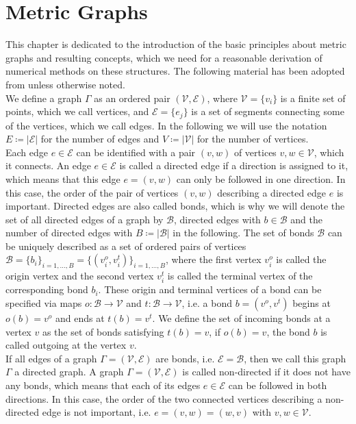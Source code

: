 \section{Metric Graphs}
\label{ch1:sec1}

This chapter is dedicated to the introduction of the basic principles about metric graphs and resulting concepts, which we need for a reasonable derivation of numerical methods on these structures. The following material has been adopted from \cite[chapter~1]{BerkolaikoKuchment:2013} unless otherwise noted. \\

We define a graph $\Gamma$ as an ordered pair $(\mathcal{V}, \mathcal{E})$, where $\mathcal{V} = \{v_i\}$ is a finite set of points, which we call vertices, and $\mathcal{E} = \{e_j\}$ is a set of segments connecting some of the vertices, which we call edges. In the following we will use the notation $E \coloneqq \left\lvert \mathcal{E} \right\rvert$ for the number of edges and $V \coloneqq \left\lvert \mathcal{V} \right\rvert$ for the number of vertices. \\
Each edge $e \in \mathcal{E}$ can be identified with a pair $(v, w)$ of vertices $v, w \in \mathcal{V}$, which it connects. An edge $e \in \mathcal{E}$ is called a directed edge if a direction is assigned to it, which means that this edge $e = (v, w)$ can only be followed in one direction. In this case, the order of the pair of vertices $(v, w)$ describing a directed edge $e$ is important. Directed edges are also called bonds, which is why we will denote the set of all directed edges of a graph by $\mathcal{B}$, directed edges with $b \in \mathcal{B}$ and the number of directed edges with $B \coloneqq \left\lvert \mathcal{B} \right\rvert$ in the following. The set of bonds $\mathcal{B}$ can be uniquely described as a set of ordered pairs of vertices $\mathcal{B} = \{b_i\}_{i = 1, \ldots, B} = \{(v^{o}_{i}, v^{t}_{i})\}_{i = 1, \ldots, B}$, where the first vertex $v^{o}_{i}$ is called the origin vertex and the second vertex $v^{t}_{i}$ is called the terminal vertex of the corresponding bond $b_i$. These origin and terminal vertices of a bond can be specified via maps $o \colon \mathcal{B} \to \mathcal{V}$ and $t \colon \mathcal{B} \to \mathcal{V}$, i.e. a bond $b = (v^{o}, v^{t})$ begins at $o(b) = v^{o}$ and ends at $t(b) = v^{t}$. We define the set of incoming bonds at a vertex $v$ as the set of bonds satisfying $t(b) = v$, if $o(b) = v$, the bond $b$ is called outgoing at the vertex $v$. \\
If all edges of a graph $\Gamma = (\mathcal{V}, \mathcal{E})$ are bonds, i.e. $\mathcal{E} = \mathcal{B}$, then we call this graph $\Gamma$ a directed graph. A graph $\Gamma = (\mathcal{V}, \mathcal{E})$ is called non-directed if it does not have any bonds, which means that each of its edges $e \in \mathcal{E}$ can be followed in both directions. In this case, the order of the two connected vertices describing a non-directed edge is not important, i.e. $e = (v, w) = (w, v)$ with $v, w \in \mathcal{V}$. \\
